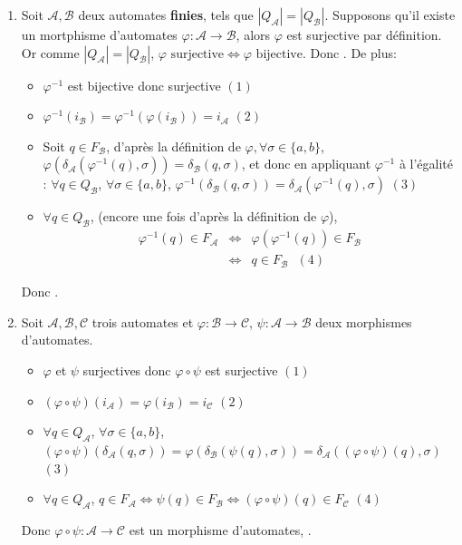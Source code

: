 \documentclass{article}
\begin{document}
\begin{enumerate}
    \item Soit $\mathcal{A}, \mathcal{B}$ deux automates \textbf{finies}, tels que $|Q_\mathcal{A}| = |Q_\mathcal{B}|$. Supposons qu'il existe un mortphisme d'automates $\varphi : \mathcal{A} \rightarrow \mathcal{B}$, alors $\varphi$ est surjective par définition. Or comme $|Q_\mathcal{A}| = |Q_\mathcal{B}|$, $\varphi \text{ surjective} \Leftrightarrow \varphi \text{ bijective}$. Donc . \newline
    De plus: \begin{itemize}
        \item $\varphi^{-1}$ est bijective donc surjective $(1)$
        \item $\varphi^{-1}(i_\mathcal{B}) = \varphi^{-1}(\varphi(i_\mathcal{B})) = i_\mathcal{A}$ $(2)$
        \item Soit $q \in F_\mathcal{B}$, d'après la définition de $\varphi, \forall \sigma \in \{ a, b\}$, $\varphi(\delta_\mathcal{A}(\varphi^{-1}(q), \sigma)) = \delta_\mathcal{B}(q, \sigma)$, et donc en appliquant $\varphi^{-1}$ à l'égalité : \newline
        $\forall q \in Q_\mathcal{B}$, $\forall \sigma \in \{ a, b\}$, $ \varphi^{-1}(\delta_\mathcal{B}(q, \sigma)) = \delta_\mathcal{A}(\varphi^{-1}(q), \sigma)$ $(3)$
        \item $\forall q \in Q_\mathcal{B}$, (encore une fois d'après la définition de $\varphi$), \begin{eqnarray*}
            \varphi^{-1}(q) \in F_\mathcal{A} & \Longleftrightarrow & \varphi(\varphi^{-1}(q)) \in F_\mathcal{B} \\
            & \Longleftrightarrow & q \in F_\mathcal{B} \text{ $(4)$}
        \end{eqnarray*}
    \end{itemize}
    Donc .
    \item Soit $\mathcal{A}, \mathcal{B}, \mathcal{C}$ trois automates et  $\varphi : \mathcal{B} \rightarrow \mathcal{C}$,  $\psi : \mathcal{A} \rightarrow \mathcal{B}$ deux morphismes d'automates.
    \begin{itemize}
        \item $\varphi$ et $\psi$ surjectives donc $\varphi \circ \psi$ est surjective $(1)$
        \item $(\varphi \circ \psi)(i_\mathcal{A}) = \varphi(i_\mathcal{B}) = i_\mathcal{C}$ $(2)$
        \item  $\forall q \in Q_\mathcal{A}$, $\forall \sigma \in \{ a, b\}$, $(\varphi \circ \psi)(\delta_\mathcal{A}(q, \sigma)) = \varphi(\delta_\mathcal{B}(\psi(q), \sigma)) = \delta_\mathcal{A}((\varphi \circ \psi)(q), \sigma)$ $(3)$
        \item $\forall q \in Q_\mathcal{A}$, $q \in F_\mathcal{A} \Longleftrightarrow \psi(q) \in F_\mathcal{B} \Longleftrightarrow (\varphi \circ \psi)(q) \in F_\mathcal{C}$ $(4)$
    \end{itemize}
    Donc $\varphi \circ \psi : \mathcal{A} \rightarrow \mathcal{C}$ est un morphisme d'automates, .
\end{enumerate}
\end{document}
